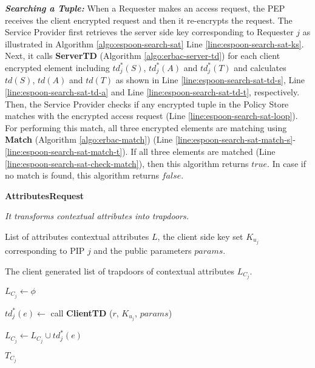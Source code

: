 \documentclass[epsfig,a4paper,11pt,titlepage]{book}
\numberwithin{algorithm}{chapter}
\newcommand{\algofontsize}{\fontsize{11}{12}\selectfont}
\begin{document}
\noindent \emph{\textbf{Searching a Tuple:}}
When a Requester makes an access request, the \gls{PEP} receives the client encrypted request and then it re-encrypts the request. The Service Provider first retrieves the server side key corresponding to Requester $j$ as illustrated in Algorithm \ref{algo:espoon-search-sat} Line \ref{line:espoon-search-sat-ks}. Next, it calls \textbf{ServerTD} (Algorithm \ref{algo:erbac-server-td}) for each client encrypted element including $td^*_j (S)$, $td^*_j (A)$ and $td^*_j (T)$ and calculates $td(S)$, $td(A)$ and $td(T)$ as shown in Line \ref{line:espoon-search-sat-td-s}, Line \ref{line:espoon-search-sat-td-a} and Line \ref{line:espoon-search-sat-td-t}, respectively. Then, the Service Provider checks if any encrypted tuple in the Policy Store matches with the encrypted access request (Line \ref{line:espoon-search-sat-loop}). For performing this match, all three encrypted elements are matching using \textbf{Match} (Algorithm \ref{algo:erbac-match}) (Line \ref{line:espoon-search-sat-match-s}-\ref{line:espoon-search-sat-match-t}). If all three elements are matched (Line \ref{line:espoon-search-sat-check-match}), then this algorithm returns $\mathit{true}$. In case if no match is found, this algorithm returns $\mathit{false}$.



\begin{algorithm} [htp]
{\algofontsize
\caption{\textbf{AttributesRequest}}

\label{algo:erbac-request-contextual-condition}

\begin{algorithmic}[1]

\INPUT \emph{It transforms contextual attributes into trapdoors.}

\Require List of attributes contextual attributes $L$, the client side key set $K_{u_j}$ corresponding to \gls{PIP} $j$ and the public parameters $params$.

\Ensure The client generated list of trapdoors of contextual attributes $L_{C_j}$.

\medskip

\State $L_{C_j} \leftarrow \phi$ \label{request-cc-init}

 \label{request-cc-loop}

	\State $td^*_j (e) \leftarrow$ call \textbf{ClientTD} ($r$, $K_{u_j}$, $params$) \label{request-cc-td}
	
	\State $L_{C_j} \leftarrow L_{C_j} \cup td^*_j (e)$ \label{request-cc-update}

\EndFor

\Return $T_{C_j}$

\end{algorithmic}
}
\end{algorithm}
\end{document}
